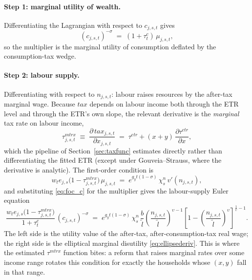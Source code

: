 \paragraph{Step 1: marginal utility of wealth.} Differentiating the Lagrangian with respect to $c_{j,s,t}$ gives
\begin{equation}
\label{eq:foc_c}
(c_{j,s,t})^{-\sigma} \;=\; (1+\tau^c_t)\,\mu_{j,s,t},
\end{equation}
so the multiplier is the marginal utility of consumption deflated by the consumption-tax wedge.

\paragraph{Step 2: labour supply.} Differentiating with respect to $n_{j,s,t}$: labour raises resources by the after-tax marginal wage. Because $tax$ depends on labour income both through the ETR level and through the ETR's own slope, the relevant derivative is the \emph{marginal} tax rate on labour income,
\begin{equation}
\label{eq:mtrdef}
\tau^{mtrx}_{j,s,t} \;\equiv\; \frac{\partial\, tax_{j,s,t}}{\partial x_{j,s,t}}
\;=\; \tau^{etr} + (x+y)\,\frac{\partial \tau^{etr}}{\partial x},
\end{equation}
which the pipeline of Section~\ref{sec:taxfunc} estimates directly rather than differentiating the fitted ETR (except under Gouveia--Strauss, where the derivative is analytic). The first-order condition is
\begin{equation}
\label{eq:eul_labor_raw}
w_t e_{j,s}\bigl(1-\tau^{mtrx}_{j,s,t}\bigr)\,\mu_{j,s,t}
\;=\; e^{g_y t(1-\sigma)}\,\chi^n_s\, v'(n_{j,s,t}),
\end{equation}
and substituting \eqref{eq:foc_c} for the multiplier gives the labour-supply Euler equation
\begin{equation}
\label{eq:eul_labor}
\frac{w_t e_{j,s}\bigl(1-\tau^{mtrx}_{j,s,t}\bigr)}{1+\tau^c_t}\,(c_{j,s,t})^{-\sigma}
\;=\; e^{g_y t(1-\sigma)}\,\chi^n_s\,
\frac{b}{\tilde{l}}\left(\frac{n_{j,s,t}}{\tilde{l}}\right)^{\upsilon-1}
\left[1-\left(\frac{n_{j,s,t}}{\tilde{l}}\right)^{\upsilon}\right]^{\frac{1}{\upsilon}-1}.
\end{equation}
The left side is the utility value of the after-tax, after-consumption-tax real wage; the right side is the elliptical marginal disutility \eqref{eq:ellipsederiv}. This is where the estimated $\tau^{mtrx}$ function bites: a reform that raises marginal rates over some income range rotates this condition for exactly the households whose $(x,y)$ fall in that range.

